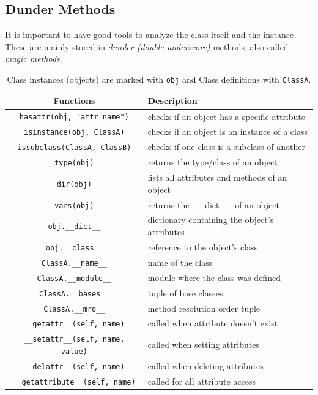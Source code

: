 \subsection{Dunder Methods}

  It is important to have good tools to analyze the class itself and the instance. These are mainly stored in \textit{dunder (double underscore)} methods, also called \textit{magic methods}. 

  \begin{definition}
    \label{def:class-and-type-information}
    \begin{table}[H]
      \centering
      \begin{tabular}{|c|p{8cm}|}
        \hline
        \textbf{Functions} & \textbf{Description} \\
        \hline 
        \texttt{hasattr(obj, "attr\_name")} & checks if an object has a specific attribute \\
        \hline
        \texttt{isinstance(obj, ClassA)} & checks if an object is an instance of a class \\
        \hline
        \texttt{issubclass(ClassA, ClassB)} & checks if one class is a subclass of another \\
        \hline
        \texttt{type(obj)} & returns the type/class of an object \\
        \hline
        \texttt{dir(obj)} & lists all attributes and methods of an object \\
        \hline
        \texttt{vars(obj)} & returns the \_\_dict\_\_ of an object \\
        \hline
        \texttt{obj.\_\_dict\_\_} & dictionary containing the object's attributes \\
        \hline
        \texttt{obj.\_\_class\_\_} & reference to the object's class \\
        \hline
        \texttt{ClassA.\_\_name\_\_} & name of the class \\
        \hline
        \texttt{ClassA.\_\_module\_\_} & module where the class was defined \\
        \hline
        \texttt{ClassA.\_\_bases\_\_} & tuple of base classes \\
        \hline
        \texttt{ClassA.\_\_mro\_\_} & method resolution order tuple \\
        \hline
        \texttt{\_\_getattr\_\_(self, name)} & called when attribute doesn't exist \\
        \hline
        \texttt{\_\_setattr\_\_(self, name, value)} & called when setting attributes \\
        \hline
        \texttt{\_\_delattr\_\_(self, name)} & called when deleting attributes \\
        \hline
        \texttt{\_\_getattribute\_\_(self, name)} & called for all attribute access \\
        \hline
      \end{tabular}
      \caption{Class instances (objects) are marked with \texttt{obj} and Class definitions with \texttt{ClassA}.}
      \label{tab:functions_for_classes}
    \end{table}
  \end{definition}

